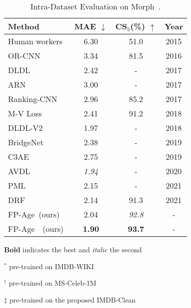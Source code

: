\begin{table}[tb] 
	\caption{Intra-Dataset Evaluation on Morph~\cite{ricanekMORPHLongitudinalImage2006}.}\label{tab:morph-results-s3}
	\begin{center}
    	\begin{threeparttable}
    		\begin{tabular}{l|c|c|c}
    			\toprule
    			{Method} & {MAE} $\downarrow$  & {CS$_5$(\%)} $\uparrow$&{Year} \\
    			\midrule
    			\midrule
    			Human workers~\cite{niuOrdinalRegressionMultiple2016} & 6.30 & 51.0  & 2015 \\
    	    	OR-CNN~\cite{niuOrdinalRegressionMultiple2016} & 3.34 & 81.5 & 2016 \\		
    			DLDL~\cite{gaoDeepLabelDistribution2017}  & 2.42 & - & 2017 \\
    			ARN~\cite{agustssonAnchoredRegressionNetworks2017} & 3.00 & - & 2017 \\	    			Ranking-CNN~\cite{chenUsingRankingCNNAge2017}\tnote{$\ast$}  & 2.96 & 85.2 & 2017 \\
    			M-V Loss\cite{panMeanVarianceLossDeep2018} & 2.41 & 91.2 & 2018 \\
    			DLDL-V2~\cite{gaoAgeEstimationUsing2018}\tnote{$\dagger$}  & {1.97} & - & 2018 \\
    			BridgeNet~\cite{liBridgeNetContinuityAwareProbabilistic2019}\tnote{$\ast$} & 2.38 & - & 2019 \\
    			C3AE~\cite{zhangC3AEExploringLimits2019}\tnote{$\ast$} & 2.75 & - & 2019 \\
    			AVDL~\cite{wenAdaptiveVarianceBased2020}\tnote{$\ast$} & \textit{1.94} & - & 2020 \\
    			PML~\cite{dengPMLProgressiveMargin2021} & {2.15} & -  &  {2021} \\ 
    			DRF~\cite{shenDeepDifferentiableRandom2021} & 2.14 & 91.3 & 2021 \\ 
    			\midrule
    			FP-Age~(ours) & 2.04& \textit{92.8} &{-} \\
    			FP-Age\tnote{$\ddagger$}~~(ours) & \textbf{1.90} & \textbf{93.7} &{-} \\
    			\bottomrule
    		\end{tabular}
    	
	
    	\begin{tablenotes}
    	\item \textbf{Bold} indicates the best and \textit{italic} the second
    	\item $^\ast$ pre-trained on IMDB-WIKI
    	\item $^\dagger$ pre-trained on MS-Celeb-1M
    	\item $\ddagger$ pre-trained on the proposed IMDB-Clean 
    	\end{tablenotes}
    	\end{threeparttable}
	\end{center}
\end{table}


